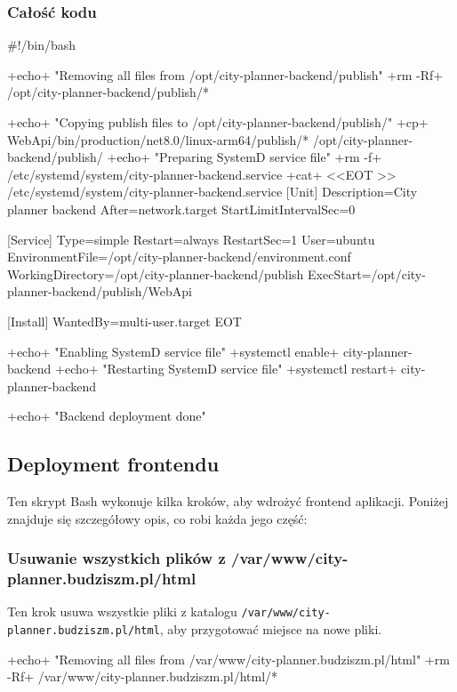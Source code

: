 \subsubsection{Całość kodu}
\begin{longlisting}[style=shell-colored,label={lst:db7}]
#!/bin/bash

+echo+ "Removing all files from /opt/city-planner-backend/publish"
+rm -Rf+ /opt/city-planner-backend/publish/*

+echo+ "Copying publish files to /opt/city-planner-backend/publish/"
+cp+ WebApi/bin/production/net8.0/linux-arm64/publish/* /opt/city-planner-backend/publish/
+echo+ "Preparing SystemD service file"
+rm -f+ /etc/systemd/system/city-planner-backend.service
+cat+ <<EOT >> /etc/systemd/system/city-planner-backend.service
[Unit]
Description=City planner backend
After=network.target
StartLimitIntervalSec=0

[Service]
Type=simple
Restart=always
RestartSec=1
User=ubuntu
EnvironmentFile=/opt/city-planner-backend/environment.conf
WorkingDirectory=/opt/city-planner-backend/publish
ExecStart=/opt/city-planner-backend/publish/WebApi

[Install]
WantedBy=multi-user.target
EOT

+echo+ "Enabling SystemD service file"
+systemctl enable+ city-planner-backend
+echo+ "Restarting SystemD service file"
+systemctl restart+ city-planner-backend

+echo+ "Backend deployment done"
\end{longlisting}

\subsection{Deployment frontendu}
Ten skrypt Bash wykonuje kilka kroków, aby wdrożyć frontend aplikacji.
Poniżej znajduje się szczegółowy opis, co robi każda jego część:

\subsubsection{Usuwanie wszystkich plików z \newline
/var/www/city-planner.budziszm.pl/html}
Ten krok usuwa wszystkie pliki z katalogu \texttt{/var/www/city-planner.budziszm.pl/html}, aby przygotować miejsce na nowe pliki.
\begin{longlisting}[style=shell-colored]
+echo+ "Removing all files from /var/www/city-planner.budziszm.pl/html"
+rm -Rf+ /var/www/city-planner.budziszm.pl/html/*
\end{longlisting}

